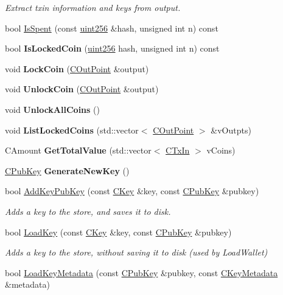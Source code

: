 \begin{DoxyCompactItemize}
\begin{DoxyCompactList}\small\item\em Extract txin information and keys from output. \end{DoxyCompactList}\item 
bool \mbox{\hyperlink{group__map_wallet_ga6adcf1c224ed3c3fe4b0b19f6fca75d8}{Is\+Spent}} (const \mbox{\hyperlink{classuint256}{uint256}} \&hash, unsigned int n) const
\item 
bool {\bfseries Is\+Locked\+Coin} (\mbox{\hyperlink{classuint256}{uint256}} hash, unsigned int n) const
\item 
void {\bfseries Lock\+Coin} (\mbox{\hyperlink{class_c_out_point}{C\+Out\+Point}} \&output)
\item 
void {\bfseries Unlock\+Coin} (\mbox{\hyperlink{class_c_out_point}{C\+Out\+Point}} \&output)
\item 
void {\bfseries Unlock\+All\+Coins} ()
\item 
void {\bfseries List\+Locked\+Coins} (std\+::vector$<$ \mbox{\hyperlink{class_c_out_point}{C\+Out\+Point}} $>$ \&v\+Outpts)
\item 
C\+Amount {\bfseries Get\+Total\+Value} (std\+::vector$<$ \mbox{\hyperlink{class_c_tx_in}{C\+Tx\+In}} $>$ v\+Coins)
\item 
\mbox{\hyperlink{class_c_pub_key}{C\+Pub\+Key}} {\bfseries Generate\+New\+Key} ()
\item 
bool \mbox{\hyperlink{group__map_wallet_ga3240da36cd717146296969227a3e0bd5}{Add\+Key\+Pub\+Key}} (const \mbox{\hyperlink{class_c_key}{C\+Key}} \&key, const \mbox{\hyperlink{class_c_pub_key}{C\+Pub\+Key}} \&pubkey)
\begin{DoxyCompactList}\small\item\em Adds a key to the store, and saves it to disk. \end{DoxyCompactList}\item 
\mbox{\label{class_c_wallet_a439bab81d7989f91a4f0909960516eea}} 
bool \mbox{\hyperlink{class_c_wallet_a439bab81d7989f91a4f0909960516eea}{Load\+Key}} (const \mbox{\hyperlink{class_c_key}{C\+Key}} \&key, const \mbox{\hyperlink{class_c_pub_key}{C\+Pub\+Key}} \&pubkey)
\begin{DoxyCompactList}\small\item\em Adds a key to the store, without saving it to disk (used by Load\+Wallet) \end{DoxyCompactList}\item 
bool \mbox{\hyperlink{group__map_wallet_ga21e6580474514f838dfe1446890085a4}{Load\+Key\+Metadata}} (const \mbox{\hyperlink{class_c_pub_key}{C\+Pub\+Key}} \&pubkey, const \mbox{\hyperlink{class_c_key_metadata}{C\+Key\+Metadata}} \&metadata)

\end{DoxyCompactItemize}
